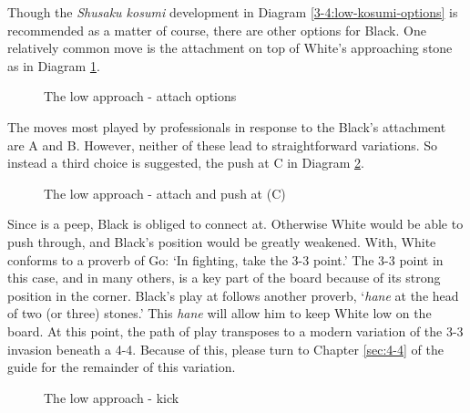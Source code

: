 \documentclass[a5paper,12pt,twoside]{book} %
\newcommand{\dref}[1]{Diagram \ref{#1}}
\begin{document}
Though the \textit{Shusaku kosumi} development in \dref{3-4:low-kosumi-options} is recommended as a matter of course, there are other options for Black. One relatively common move is the attachment on top of White's approaching stone as in \dref{3-4:low-attach-options}.\\

\begin{figure}[!htbp]
 
\vspace{-0.6cm}\caption{The low approach - attach options}
\label{3-4:low-attach-options}
\end{figure}

The moves most played by professionals in response to the Black's attachment are A and B. However, neither of these lead to straightforward variations. So instead a third choice is suggested, the push at C in \dref{3-4:low-attach-C}.\\

\begin{figure}[!htbp]
 
\vspace{-0.6cm}\caption{The low approach - attach and push at (C)}
\label{3-4:low-attach-C}
\end{figure}

Since{\large\whitestone[3]} is a peep, Black is obliged to connect at{\large\blackstone[4]}. Otherwise White would be able to push through, and Black's position would be greatly weakened. With{\large\whitestone[5]}, White conforms to a proverb of Go: `In fighting, take the 3-3 point.' The 3-3 point in this case, and in many others, is a key part of the board because of its strong position in the corner. Black's play at{\large\blackstone[6]} follows another proverb, `\textit{hane} at the head of two (or three) stones.' This \textit{hane} will allow him to keep White low on the board. At this point, the path of play transposes to a modern variation of the 3-3 invasion beneath a 4-4. Because of this, please turn to Chapter \ref{sec:4-4} of the guide for the remainder of this variation.\\

\begin{figure}[!htbp]
 
\vspace{-0.6cm}\caption{The low approach - kick}
\label{3-4:low-kick}
\end{figure}
\end{document}
